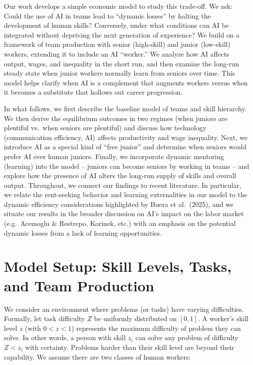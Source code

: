 \documentclass[12pt]{article}
\begin{document}
Our work develops a simple economic model to study this trade-off. We
ask: {Could the use of AI in teams lead to ``dynamic losses'' by
halting the development of human skills?} Conversely, under what
conditions can AI be integrated without depriving the next generation of
experience? We build on a framework of team production with
{senior (high-skill) and junior (low-skill) workers}, extending
it to include an AI ``worker.'' We analyze how AI affects output, wages,
and inequality in the short run, and then examine the long-run steady
state when junior workers normally learn from seniors over time. This
model helps clarify when AI is a complement that {augments
workers} versus when it becomes a substitute that {hollows out
career progression}.

In what follows, we first describe the baseline model of teams and skill
hierarchy. We then derive the equilibrium outcomes in two regimes (when
juniors are plentiful vs.~when seniors are plentiful) and discuss how
technology (communication efficiency, AI) affects productivity and wage
inequality. Next, we introduce AI as a special kind of ``free junior''
and determine when seniors would prefer AI over human juniors. Finally,
we incorporate {dynamic mentoring (learning)} into the model --
juniors can become seniors by working in teams -- and explore how the
presence of AI alters the long-run supply of skills and overall output.
Throughout, we connect our findings to recent literature. In particular,
we relate the {rent-seeking behavior and learning externalities}
in our model to the dynamic efficiency considerations highlighted by
Buera et al.~(2025), and we situate our results in the broader
discussion on AI's impact on the labor market (e.g.~Acemoglu \&
Restrepo, Korinek, etc.) with an emphasis on the potential {dynamic
losses from a lack of learning opportunities}.

\section{Model Setup: Skill Levels, Tasks, and Team
Production}\label{model-setup-skill-levels-tasks-and-team-production}

We consider an environment where problems (or tasks) have varying
difficulties. Formally, let task difficulty \(Z\) be uniformly
distributed on \([0,1]\). A worker's {skill level} \(z\) (with
\(0<z<1\)) represents the maximum difficulty of problem they can solve.
In other words, a person with skill \(z_i\) can {solve any
problem of difficulty \(Z < z_i\)} with certainty. Problems harder than
their skill level are beyond their capability. We assume there are two
classes of human workers:
\end{document}
